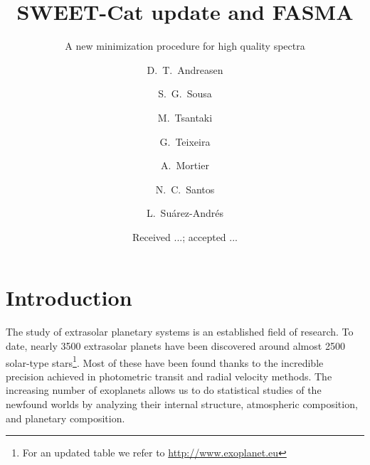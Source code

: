 \documentclass{aa}
\begin{document}
\title{SWEET-Cat update and FASMA}
\subtitle{A new minimization procedure for high quality spectra}


\author{ D.~T.~Andreasen
    \and S.~G.~Sousa
    \and M.~Tsantaki
    \and G.~Teixeira
    \and A.~Mortier
    \and N.~C.~Santos
    \and L.~Su\'arez-Andr\'es
}







\date{Received ...; accepted ...}

\abstract
{}
{}
{}
{}
{}



\maketitle



\section{Introduction}
\label{sec:introduction}
The study of extrasolar planetary systems is an established field of research.
To date, nearly 3500 extrasolar planets have been discovered around almost 2500
solar-type stars\footnote{For an updated table we refer to
\url{http://www.exoplanet.eu}}. Most of these have been found thanks to the
incredible precision achieved in photometric transit and radial velocity
methods. The increasing number of exoplanets allows us to do statistical studies
of the newfound worlds by analyzing their internal structure, atmospheric
composition, and planetary composition.
\end{document}
